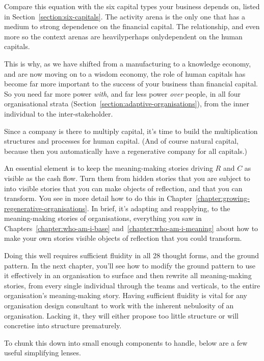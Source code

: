Compare this equation with the six capital types your business depends on, listed in Section~\ref{section:six-capitals}. The activity arena is the only one that has a medium to strong dependence on the financial capital. The relationship, and even more so the context arenas are heavily\textemdash perhaps only\textemdash dependent on the human capitals. 


This is why, as we have shifted from a manufacturing to a knowledge economy, and are now moving on to a wisdom economy, the role of human capitals has become far more important to the success of your business than financial capital. So you need far more power \emph{with}, and far less power \emph{over} people, in all four organisational strata (Section~\ref{section:adaptive-organisations}), from the inner individual to the inter-stakeholder.


Since a company is there to multiply capital, it’s time to build the multiplication structures and processes for human capital. (And of course natural capital, because then you automatically have a regenerative company for all capitals.)


An essential element is to keep the meaning\hyp{}making stories  driving $R$ and $C$ as visible as the cash flow. Turn them from hidden stories that you are subject to into visible stories that you can make objects of reflection, and that you can transform. You see in more detail how to do this in Chapter~\ref{chapter:growing-regenerative-organisations}. In brief, it's adapting and reapplying, to the meaning\hyp{}making stories of organisations, everything you saw in Chapters~\ref{chapter:who-am-i-base} and~\ref{chapter:who-am-i-meaning} about how to make your own stories visible objects of reflection that you could transform. 


Doing this well requires sufficient fluidity in all 28 thought forms, and the ground pattern. In the next chapter, you'll see how to modify the ground pattern to use it effectively in an organisation to surface and then rewrite all meaning\hyp{}making stories, from every single individual through the teams and verticals, to the entire organisation's meaning\hyp{}making story. Having sufficient fluidity is vital for any organisation design consultant to work with the inherent nebulosity of an organisation. Lacking it, they will either propose too little structure or will concretise into structure prematurely.


To chunk this down into small enough components to handle, below are a few useful simplifying lenses.



